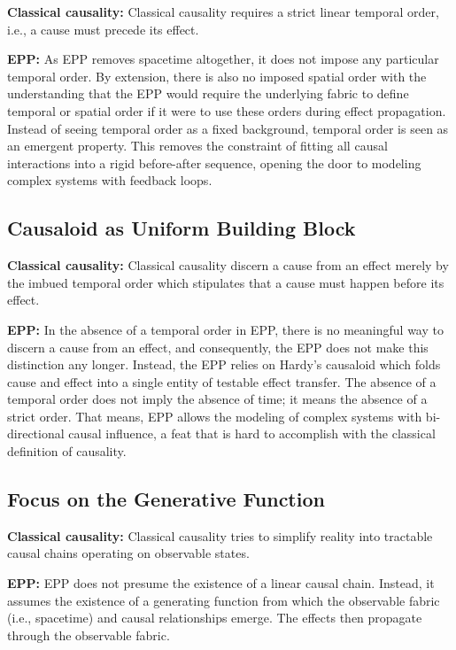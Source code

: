 \documentclass{article}
\begin{document}
\textbf{Classical causality:} 
Classical causality requires a strict linear temporal order, i.e., a cause must precede its effect.

\textbf{EPP:} 
 As EPP removes spacetime altogether, it does not impose any particular temporal order. By extension, there is also no imposed spatial order with the understanding that the EPP would require the underlying fabric to define temporal or spatial order if it were to use these orders during effect propagation.
Instead of seeing temporal order as a fixed background, temporal order is seen as an emergent property. This removes the constraint of fitting all causal interactions into a rigid before-after sequence, opening the door to modeling complex systems with feedback loops.

\subsection{Causaloid as Uniform Building Block}

\textbf{Classical causality:} 
Classical causality discern a cause from an effect merely by the imbued temporal order which stipulates that a cause must happen before its effect.

\textbf{EPP:} 
In the absence of a temporal order in EPP, there is no meaningful way to discern a cause from an effect, and consequently, the EPP does not make this distinction any longer. Instead, the EPP relies on Hardy’s causaloid which folds cause and effect into a single entity of testable effect transfer.
The absence of a temporal order does not imply the absence of time; it means the absence of a strict order. That means, EPP allows the modeling of complex systems with bi-directional causal influence, a feat that is hard to accomplish with the classical definition of causality.

\newpage

\subsection{Focus on the Generative Function}

\textbf{Classical causality:} 
Classical causality tries to simplify reality into tractable causal chains operating on observable states.


\textbf{EPP:} 
EPP does not presume the existence of a linear causal chain. Instead, it assumes the existence of a generating function from which the observable fabric (i.e., spacetime) and causal relationships emerge. The effects then propagate through the observable fabric.
\end{document}
